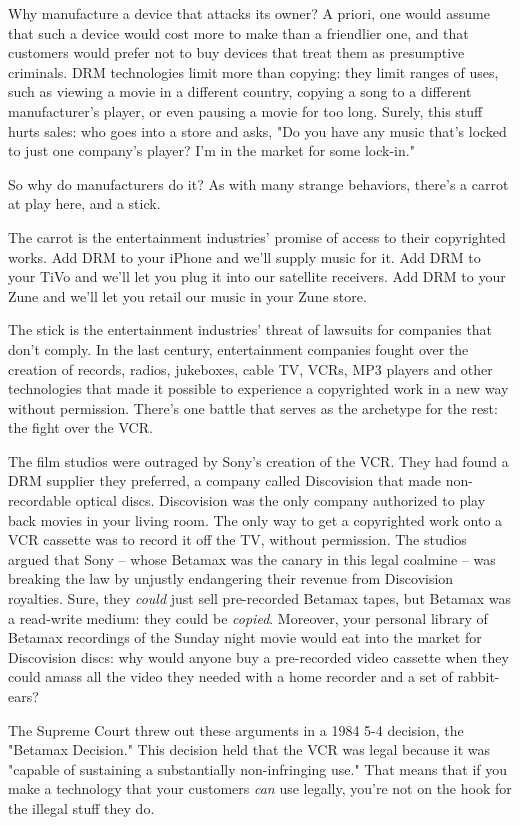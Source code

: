 Why manufacture a device that attacks its owner? A priori, one
would assume that such a device would cost more to make than a
friendlier one, and that customers would prefer not to buy devices
that treat them as presumptive criminals. DRM technologies limit
more than copying: they limit ranges of uses, such as viewing a
movie in a different country, copying a song to a different
manufacturer's player, or even pausing a movie for too long.
Surely, this stuff hurts sales: who goes into a store and asks, "Do
you have any music that's locked to just one company's player? I'm
in the market for some lock-in."

So why do manufacturers do it? As with many strange behaviors,
there's a carrot at play here, and a stick.

The carrot is the entertainment industries' promise of access to
their copyrighted works. Add DRM to your iPhone and we'll supply
music for it. Add DRM to your TiVo and we'll let you plug it into
our satellite receivers. Add DRM to your Zune and we'll let you
retail our music in your Zune store.

The stick is the entertainment industries' threat of lawsuits for
companies that don't comply. In the last century, entertainment
companies fought over the creation of records, radios, jukeboxes,
cable TV, VCRs, MP3 players and other technologies that made it
possible to experience a copyrighted work in a new way without
permission. There's one battle that serves as the archetype for the
rest: the fight over the VCR.

The film studios were outraged by Sony's creation of the VCR. They
had found a DRM supplier they preferred, a company called
Discovision that made non-recordable optical discs. Discovision was
the only company authorized to play back movies in your living
room. The only way to get a copyrighted work onto a VCR cassette
was to record it off the TV, without permission. The studios argued
that Sony -- whose Betamax was the canary in this legal coalmine --
was breaking the law by unjustly endangering their revenue from
Discovision royalties. Sure, they \emph{could} just sell
pre-recorded Betamax tapes, but Betamax was a read-write medium:
they could be \emph{copied}. Moreover, your personal library of
Betamax recordings of the Sunday night movie would eat into the
market for Discovision discs: why would anyone buy a pre-recorded
video cassette when they could amass all the video they needed with
a home recorder and a set of rabbit-ears?

The Supreme Court threw out these arguments in a 1984 5-4 decision,
the "Betamax Decision." This decision held that the VCR was legal
because it was "capable of sustaining a substantially
non-infringing use." That means that if you make a technology that
your customers \emph{can} use legally, you're not on the hook for
the illegal stuff they do.

